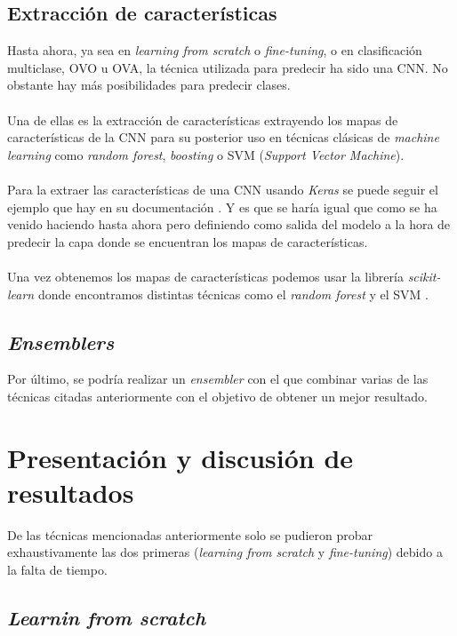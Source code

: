 \subsection{Extracción de características}

Hasta ahora, ya sea en \textit{learning from scratch} o \textit{fine-tuning}, o en clasificación multiclase, OVO u OVA, la técnica utilizada para predecir ha sido una CNN. No obstante hay más posibilidades para predecir clases.
\\ \\
Una de ellas es la extracción de características extrayendo los mapas de características de la CNN para su posterior uso en técnicas clásicas de \textit{machine learning} como \textit{random forest}, \textit{boosting} o SVM (\textit{Support Vector Machine}).
\\ \\
Para la extraer las características de una CNN usando \textit{Keras} se puede seguir el ejemplo que hay en su documentación \cite{KerasApplications}. Y es que se haría igual que como se ha venido haciendo hasta ahora pero definiendo como salida del modelo a la hora de predecir la capa donde se encuentran los mapas de características.
\\ \\
Una vez obtenemos los mapas de características podemos usar la librería \textit{scikit-learn} \cite{Sklearn} donde encontramos distintas técnicas como el \textit{random forest} y el SVM \cite{KerasAndSklearn}.

\subsection{\textit{Ensemblers}}

Por último, se podría realizar un \textit{ensembler} con el que combinar varias de las técnicas citadas anteriormente con el objetivo de obtener un mejor resultado.

\section{Presentación y discusión de resultados}

De las técnicas mencionadas anteriormente solo se pudieron probar exhaustivamente las dos primeras (\textit{learning from scratch} y \textit{fine-tuning}) debido a la falta de tiempo.

\subsection{\textit{Learnin from scratch}}

